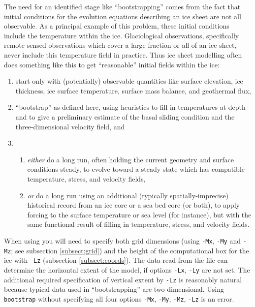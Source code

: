 The need for an identified stage like ``bootstrapping'' comes from the fact that initial conditions for the evolution equations describing an ice sheet are not all observable.  As a principal example of this problem, these initial conditions include the temperature within the ice.  Glaciological observations, specifically remote-sensed observations which cover a large fraction or all of an ice sheet, never include this temperature field in practice.  Thus ice sheet modelling often does something like this to get ``reasonable'' initial fields within the ice:
\begin{enumerate}
\item start only with (potentially) observable quantities like surface elevation, ice thickness, ice surface temperature, surface mass balance, and geothermal flux,
\item ``bootstrap'' as defined here, using heuristics to fill in temperatures at depth and to give a preliminary estimate of the basal sliding condition and the three-dimensional velocity field, and
\item \begin{enumerate}
      \item \emph{either} do a long run, often holding the current geometry and surface conditions steady, to evolve toward a steady state which has compatible temperature, stress, and velocity fields,
      \item \emph{or} do a long run using an additional (typically spatially-imprecise) historical record from an ice core or a sea bed core (or both), to apply forcing to the surface temperature or sea level (for instance), but with the same functional result of filling in temperature, stress, and velocity fields.
      \end{enumerate}
\end{enumerate}

When using  you will need to specify both grid dimensions (using \texttt{-Mx}, \texttt{-My} and \texttt{-Mz}; see subsection \ref{subsect:grid}) and the height of the computational box for the ice with \texttt{-Lz} (subsection \ref{subsect:coords}).  The data read from the file can determine the horizontal extent of the model, if options \texttt{-Lx}, \texttt{-Ly} are not set.  The additional required specification of vertical extent by \texttt{-Lz} is reasonably natural because typical data used in ``bootstrapping'' are two-dimensional.  Using \texttt{-bootstrap} without specifying all four options \texttt{-Mx}, \texttt{-My}, \texttt{-Mz}, \texttt{-Lz} is an error.

